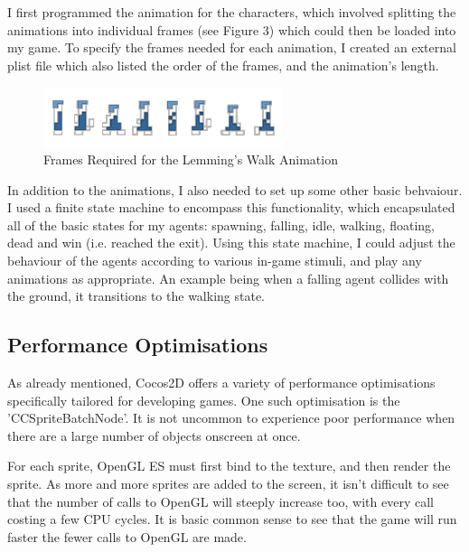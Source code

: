 \documentclass[a4paper,oneside]{report}
\begin{document}
I first programmed the animation for the characters, which involved splitting the animations into individual frames (see Figure 3) which could then be loaded into my game. To specify the frames needed for each animation, I created an external plist file which also listed the order of the frames, and the animation's length. 

\begin{figure}[h!]
  \centering
    \includegraphics[width=70mm]{sources/images/Lemming_walk_anim}
    \caption{Frames Required for the Lemming's Walk Animation}
\end{figure}

In addition to the animations, I also needed to set up some other basic behvaiour. I used a finite state machine to encompass this functionality, which encapsulated all of the basic states for my agents: spawning, falling, idle, walking, floating, dead and win (i.e. reached the exit). Using this state machine, I could adjust the behaviour of the agents according to various in-game stimuli, and play any animations as appropriate. An example being when a falling agent collides with the ground, it transitions to the walking state. 

\subsection{Performance Optimisations} 

As already mentioned, Cocos2D offers a variety of performance optimisations specifically tailored for developing games. One such optimisation is the 'CCSpriteBatchNode'. It is not uncommon to experience poor performance when there are a large number of objects onscreen at once. 

For each sprite, OpenGL ES must first bind to the texture, and then render the sprite. As more and more sprites are added to the screen, it isn't difficult to see that the number of calls to OpenGL will steeply increase too, with every call costing a few CPU cycles. It is basic common sense to see that the game will run faster the fewer calls to OpenGL are made. 
\end{document}

